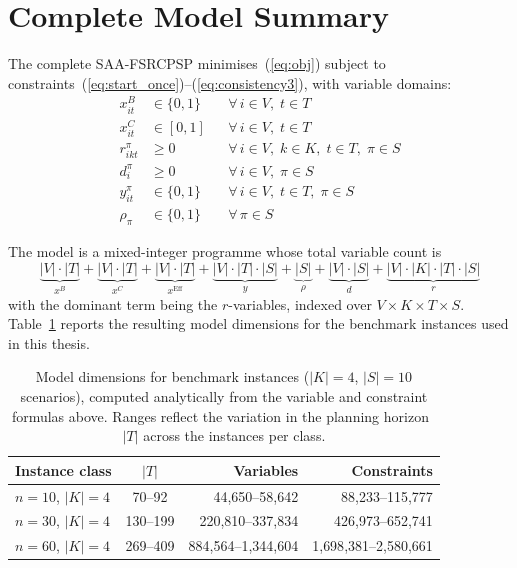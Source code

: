 \section{Complete Model Summary}
\label{sec:model_summary}

The complete SAA-FSRCPSP minimises~(\ref{eq:obj}) subject to
constraints~(\ref{eq:start_once})--(\ref{eq:consistency3}),
with variable domains:
\begin{align*}
    x^B_{it}      &\in \{0,1\}
    && \forall\, i \in V,\; t \in T \\
    x^C_{it}      &\in [0,1]
    && \forall\, i \in V,\; t \in T \\
    r_{ikt}^{\pi} &\geq 0
    && \forall\, i \in V,\; k \in K,\;
       t \in T,\; \pi \in S \\
    d_i^{\pi}     &\geq 0
    && \forall\, i \in V,\; \pi \in S \\
    y_{it}^{\pi}  &\in \{0,1\}
    && \forall\, i \in V,\; t \in T,\;
       \pi \in S \\
    \rho_{\pi}    &\in \{0,1\}
    && \forall\, \pi \in S
\end{align*}

The model is a mixed-integer programme whose total variable
count is
\[
  \underbrace{|V| \cdot |T|}_{\displaystyle x^B}
  + \underbrace{|V| \cdot |T|}_{\displaystyle x^C}
  + \underbrace{|V| \cdot |T|}_{\displaystyle x^{\mathrm{Eff}}}
  + \underbrace{|V| \cdot |T| \cdot |S|}_{\displaystyle y}
  + \underbrace{|S|}_{\displaystyle \rho}
  + \underbrace{|V| \cdot |S|}_{\displaystyle d}
  + \underbrace{|V| \cdot |K| \cdot |T| \cdot |S|}_{\displaystyle r}
\]
with the dominant term being the $r$-variables, indexed over
$V \times K \times T \times S$.
Table~\ref{tab:model_size} reports the resulting model
dimensions for the benchmark instances used in this thesis.

\begin{table}[htbp]
\centering
\caption{Model dimensions for benchmark instances
         ($|K| = 4$, $|S| = 10$ scenarios), computed analytically
         from the variable and constraint formulas above.
         Ranges reflect the variation in the planning
         horizon~$|T|$ across the instances per class.}
\label{tab:model_size}
\renewcommand{\arraystretch}{1.3}
\begin{tabular}{lcrr}
\hline
\textbf{Instance class} &
$|T|$ &
\textbf{Variables} &
\textbf{Constraints} \\
\hline
$n = 10$, $|K| = 4$
    & 70--92
    & 44{,}650--58{,}642
    & 88{,}233--115{,}777 \\
$n = 30$, $|K| = 4$
    & 130--199
    & 220{,}810--337{,}834
    & 426{,}973--652{,}741 \\
$n = 60$, $|K| = 4$
    & 269--409
    & 884{,}564--1{,}344{,}604
    & 1{,}698{,}381--2{,}580{,}661 \\
\hline
\end{tabular}
\end{table}

